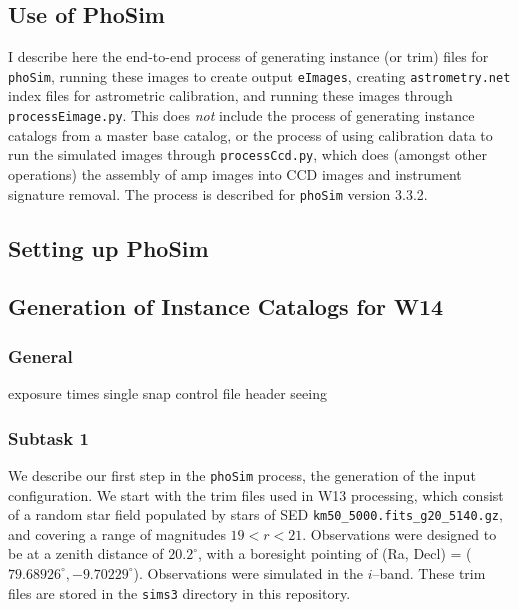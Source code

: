 \documentclass[prd, nofootinbib, floatfix, 11pt, tightenlines, times]{article}
\begin{document}
\clearpage
\begin{appendices}
\section{Use of PhoSim}

I describe here the end-to-end process of generating instance (or
trim) files for {\tt phoSim}, running these images to create output
{\tt eImages}, creating {\tt astrometry.net} index files for
astrometric calibration, and running these images through {\tt
  processEimage.py}.  This does {\it not} include the process of
generating instance catalogs from a master base catalog, or the
process of using calibration data to run the simulated images through
{\tt processCcd.py}, which does (amongst other operations) the
assembly of amp images into CCD images and instrument signature
removal.  The process is described for {\tt phoSim} version 3.3.2.

\subsection{Setting up PhoSim}

\subsection{Generation of Instance Catalogs for W14 \label{appx:tasks}}

\subsubsection{General}
exposure times
single snap
control file
header
seeing

\subsubsection{Subtask 1}

We describe our first step in the {\tt phoSim} process, the generation
of the input configuration.  We start with the trim files used in W13
processing, which consist of a random star field populated by stars of
SED {\tt km50\_5000.fits\_g20\_5140.gz}, and covering a range of
magnitudes $19 < r < 21$.  Observations were designed to be at a
zenith distance of $20.2^{\circ}$, with a boresight pointing of (Ra,
Decl) = ($79.68926^{\circ}, -9.70229^{\circ}$).  Observations were
simulated in the $i$--band.  These trim files are stored in the {\tt sims3}
directory in this repository.


\end{appendices}
\end{document}

